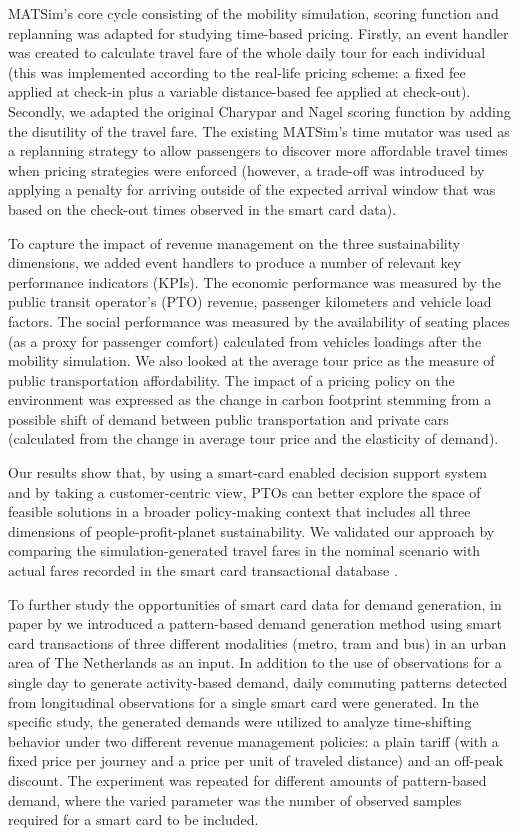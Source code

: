 MATSim's core cycle consisting of the mobility simulation, scoring function and replanning was adapted for studying time-based pricing. Firstly, an event handler was created to calculate travel fare of the whole daily tour for each individual (this was implemented according to the real-life pricing scheme: a fixed fee applied at check-in plus a variable distance-based fee applied at check-out). Secondly, we adapted the original Charypar and Nagel scoring function \citep[][]{CharyparNagel_Transportation_2005} by adding the disutility of the travel fare. The existing MATSim's time mutator was used as a replanning strategy to allow passengers to discover more affordable travel times when pricing strategies were enforced (however, a trade-off was introduced by applying a penalty for arriving outside of the expected arrival window that was based on the check-out times observed in the smart card data).

To capture the impact of revenue management on the three sustainability dimensions, we added event handlers to produce a number of relevant key performance indicators (KPIs). The economic performance was measured by the public transit operator's (PTO) revenue, passenger kilometers and vehicle load factors. The social performance was measured by the availability of seating places (as a proxy for passenger comfort) calculated from vehicles loadings after the mobility simulation. We also looked at the average tour price as the measure of public transportation affordability. The impact of a pricing policy on the environment was expressed as the change in carbon footprint stemming from a possible shift of demand between public transportation and private cars (calculated from the change in average tour price and the elasticity of demand). 

Our results show that, by using a smart-card enabled decision support system and by taking a customer-centric view, PTOs can better explore the space of feasible solutions in a broader policy-making context that includes all three dimensions of people-profit-planet sustainability. We validated our approach by comparing the simulation-generated travel fares in the nominal scenario with actual fares recorded in the smart card transactional database \citep[see][]{LovricEtAl_DSS_2013}.

To further study the opportunities of smart card data for demand generation, in paper by \citet[][]{BoumanEtAl_AAMAS_2012} we introduced a pattern-based demand generation method using smart card transactions of three different modalities (metro, tram and bus) in an urban area of The Netherlands as an input. In addition to the use of observations for a single day to generate activity-based demand, daily commuting patterns detected from longitudinal observations for a single smart card were generated. In the specific study, the generated demands were utilized to analyze time-shifting behavior under two different revenue management policies: a plain tariff (with a fixed price per journey and a price per unit of traveled distance) and an off-peak discount. The experiment was repeated for different amounts of pattern-based demand, where the varied parameter was the number of observed samples required for a smart card to be included. 

